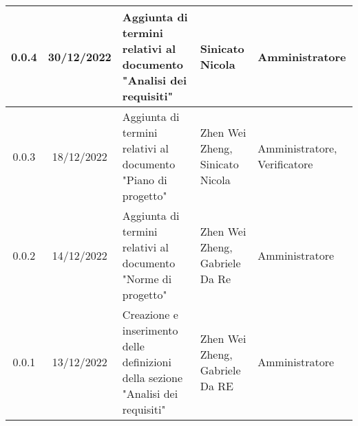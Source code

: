 \begin{center}
\begin{tabularx}{\textwidth}{| c | c | X | X | X |}
 \hline
 0.0.4 & 30/12/2022 & Aggiunta di termini relativi al documento "Analisi dei requisiti" & Sinicato Nicola & Amministratore \\
 \hline
 0.0.3 & 18/12/2022 & Aggiunta di termini relativi al documento "Piano di progetto" & Zhen Wei Zheng, Sinicato Nicola & Amministratore, Verificatore\\
 \hline
 0.0.2 & 14/12/2022 & Aggiunta di termini relativi al documento "Norme di progetto" & Zhen Wei Zheng, Gabriele Da Re & Amministratore\\
 \hline
 0.0.1 & 13/12/2022 & Creazione e inserimento delle definizioni della sezione "Analisi dei requisiti" & Zhen Wei Zheng, Gabriele Da RE & Amministratore\\
 \hline
\end{tabularx}
\end{center}
